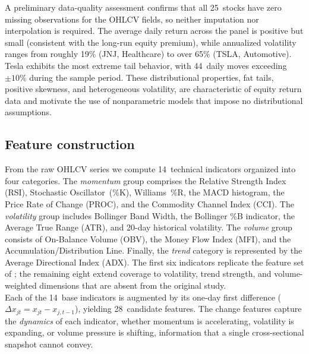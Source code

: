 \documentclass{rQUF2e}
\begin{document}
\noindent A preliminary data-quality assessment confirms that all 25~stocks have zero missing observations for the OHLCV fields, so neither imputation nor interpolation is required. The average daily return across the panel is positive but small (consistent with the long-run equity premium), while annualized volatility ranges from roughly 19\% (JNJ, Healthcare) to over 65\% (TSLA, Automotive). Tesla exhibits the most extreme tail behavior, with 44~daily moves exceeding $\pm 10\%$ during the sample period. These distributional properties, fat tails, positive skewness, and heterogeneous volatility, are characteristic of equity return data and motivate the use of nonparametric models that impose no distributional assumptions.

\subsection{Feature construction}

From the raw OHLCV series we compute 14~technical indicators organized into four categories. The \textit{momentum} group comprises the Relative Strength Index (RSI), Stochastic Oscillator~(\%K), Williams~\%R, the MACD histogram, the Price Rate of Change (PROC), and the Commodity Channel Index (CCI). The \textit{volatility} group includes Bollinger Band Width, the Bollinger \%B indicator, the Average True Range (ATR), and 20-day historical volatility. The \textit{volume} group consists of On-Balance Volume (OBV), the Money Flow Index (MFI), and the Accumulation/Distribution Line. Finally, the \textit{trend} category is represented by the Average Directional Index (ADX). The first six indicators replicate the feature set of \citet{basak2019predicting}; the remaining eight extend coverage to volatility, trend strength, and volume-weighted dimensions that are absent from the original study. \\

\noindent Each of the 14~base indicators is augmented by its one-day first difference ($\Delta x_{jt} = x_{jt} - x_{j,t-1}$), yielding 28~candidate features. The change features capture the \emph{dynamics} of each indicator, whether momentum is accelerating, volatility is expanding, or volume pressure is shifting, information that a single cross-sectional snapshot cannot convey. \\
\end{document}
